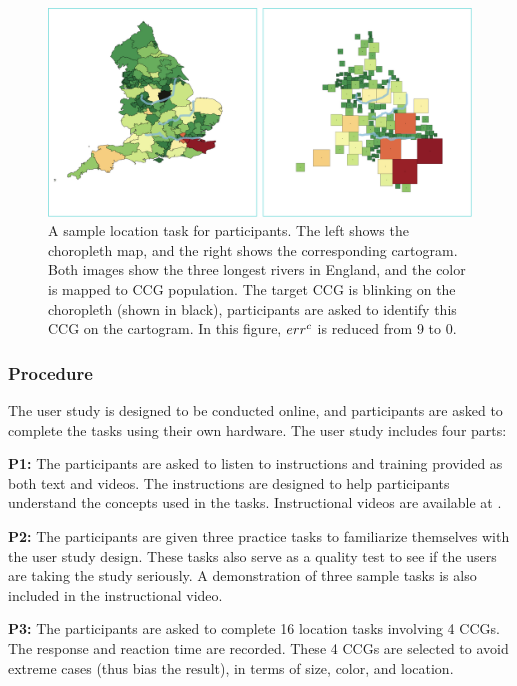    {
        \begin{figure}[tb!]
            \centering
            \includegraphics[width=\columnwidth,keepaspectratio]{figure/evaluation/task.png}
            \caption{A sample location task for participants. The left shows the choropleth map, and the right shows the corresponding cartogram. Both images show the three longest rivers in England, and the color is mapped to CCG population. The target CCG is blinking on the choropleth (shown in black), participants are asked to identify this CCG on the cartogram. In this figure, $ err^{c} $ is reduced from 9 to 0. }
            \label{fig:task}
        \end{figure}
    }

\subsubsection{Procedure}

The user study is designed to be conducted online, and participants are asked to complete the tasks using their own hardware. The user study includes four parts:

\textbf{P1:} The participants are asked to listen to instructions and training provided as both text and videos. The instructions are designed to help participants understand the concepts used in the tasks. Instructional videos are available at .

\textbf{P2:} The participants are given three practice tasks to familiarize themselves with the user study design. These tasks also serve as a quality test to see if the users are taking the study seriously. A demonstration of three sample tasks is also included in the instructional video.

\textbf{P3:} The participants are asked to complete 16 location tasks involving 4 CCGs. The response and reaction time are recorded. These 4 CCGs are selected to avoid extreme cases (thus bias the result), in terms of size, color, and location.

